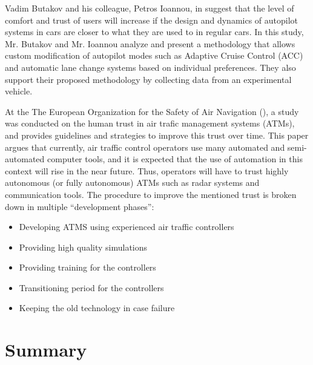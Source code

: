 \documentclass[runningheads,a4paper]{llncs}
\begin{document}
Vadim Butakov and his colleague, Petros Ioannou, in \cite{butakov2015driving} suggest that the level of comfort and trust of users will increase if the design and dynamics of autopilot systems in cars are closer to what they are used to in regular cars. In this study, Mr. Butakov and Mr. Ioannou analyze and present a methodology that allows custom modification of autopilot modes such as  Adaptive Cruise Control (ACC) and automatic lane change systems based on individual preferences. They also support their proposed methodology by collecting data from an experimental vehicle.

At the The European Organization for the Safety of Air Navigation (\cite{kelly2003guidelines}), a study was conducted on the human trust in air trafic management systems (ATMs), and provides guidelines and strategies to improve this trust over time. This paper argues that currently, air traffic control operators use many automated and semi-automated computer tools, and it is expected that the use of automation in this context will rise in the near future. Thus, operators will have to trust highly autonomous (or fully autonomous) ATMs such as radar systems and communication tools. The procedure to improve the mentioned trust is broken down in multiple ``development phases'':
\begin{itemize}
	\item Developing ATMS using experienced air traffic controllers
	\item Providing high quality simulations
	\item Providing training for the controllers
	\item Transitioning period for the controllers
	\item Keeping the old technology in case failure
\end{itemize}


\section{Summary}
\end{document}
